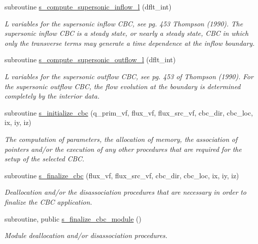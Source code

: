 \begin{DoxyCompactItemize}
subroutine \hyperlink{namespacem__cbc_aef459892802977978a425cd85648c706}{s\+\_\+compute\+\_\+supersonic\+\_\+inflow\+\_\+l} (dflt\+\_\+int)
\begin{DoxyCompactList}\small\item\em L variables for the supersonic inflow C\+BC, see pg. 453 Thompson (1990). The supersonic inflow C\+BC is a steady state, or nearly a steady state, C\+BC in which only the transverse terms may generate a time dependence at the inflow boundary. \end{DoxyCompactList}\item 
subroutine \hyperlink{namespacem__cbc_a95f3cad9b9fec4f08b561da8f0db6584}{s\+\_\+compute\+\_\+supersonic\+\_\+outflow\+\_\+l} (dflt\+\_\+int)
\begin{DoxyCompactList}\small\item\em L variables for the supersonic outflow C\+BC, see pg. 453 of Thompson (1990). For the supersonic outflow C\+BC, the flow evolution at the boundary is determined completely by the interior data. \end{DoxyCompactList}\item 
subroutine \hyperlink{namespacem__cbc_a50fed863b4ee14bf81590ed80154b539}{s\+\_\+initialize\+\_\+cbc} (q\+\_\+prim\+\_\+vf, flux\+\_\+vf, flux\+\_\+src\+\_\+vf, cbc\+\_\+dir, cbc\+\_\+loc, ix, iy, iz)
\begin{DoxyCompactList}\small\item\em The computation of parameters, the allocation of memory, the association of pointers and/or the execution of any other procedures that are required for the setup of the selected C\+BC. \end{DoxyCompactList}\item 
subroutine \hyperlink{namespacem__cbc_a3fcf7cde1a04a7ee72ced4aa62cf53d0}{s\+\_\+finalize\+\_\+cbc} (flux\+\_\+vf, flux\+\_\+src\+\_\+vf, cbc\+\_\+dir, cbc\+\_\+loc, ix, iy, iz)
\begin{DoxyCompactList}\small\item\em Deallocation and/or the disassociation procedures that are necessary in order to finalize the C\+BC application. \end{DoxyCompactList}\item 
subroutine, public \hyperlink{namespacem__cbc_a76b737dff5c827677888ffde0aff9cf1}{s\+\_\+finalize\+\_\+cbc\+\_\+module} ()
\begin{DoxyCompactList}\small\item\em Module deallocation and/or disassociation procedures. \end{DoxyCompactList}\end{DoxyCompactItemize}
